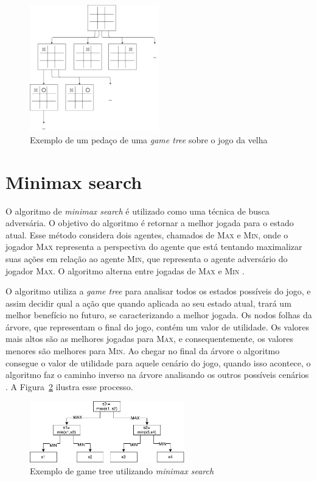 \begin{figure}[ht]
	\centering
	\includegraphics[width=0.5\textwidth]{fig/jogodavelha.pdf}
	\caption{Exemplo de um pedaço de uma \textit{game tree} sobre o jogo da velha}
	\label{fig:jogodavelha}
\end{figure} 

\section{Minimax search}

O algoritmo de \textit{minimax search} é utilizado como uma técnica de busca adversária. O objetivo do algoritmo é retornar a melhor jogada para o estado atual. Esse método considera dois agentes, chamados de \textsc{Max} e \textsc{Min}, onde o jogador \textsc{Max} representa a perspectiva do agente que está tentando maximalizar suas ações em relação ao agente \textsc{Min}, que representa o agente adversário do jogador \textsc{Max}. O algoritmo alterna entre jogadas de \textsc{Max} e \textsc{Min} \cite{intelligence2003modern}. 

O algoritmo utiliza a \textit{game tree} para analisar todos os estados possíveis do jogo, e assim decidir qual a ação que quando aplicada ao seu estado atual, trará um melhor benefício no futuro, se caracterizando a melhor jogada. Os nodos folhas da árvore, que representam o final do jogo, contém um valor de utilidade. Os valores mais altos são as melhores jogadas para \textsc{Max}, e consequentemente, os valores menores são melhores para \textsc{Min}. Ao chegar no final da árvore o algoritmo consegue o valor de utilidade para aquele cenário do jogo, quando isso acontece, o algoritmo faz o caminho inverso na árvore analisando os outros possíveis cenários \cite{intelligence2003modern}. A Figura~\ref{fig:gametree} ilustra esse processo.

\begin{figure}[ht]
	\centering
	\includegraphics[width=0.6\textwidth]{fig/gametree.pdf}
	\caption{Exemplo de game tree utilizando \textit{minimax search}}
	\label{fig:gametree}
\end{figure} 

